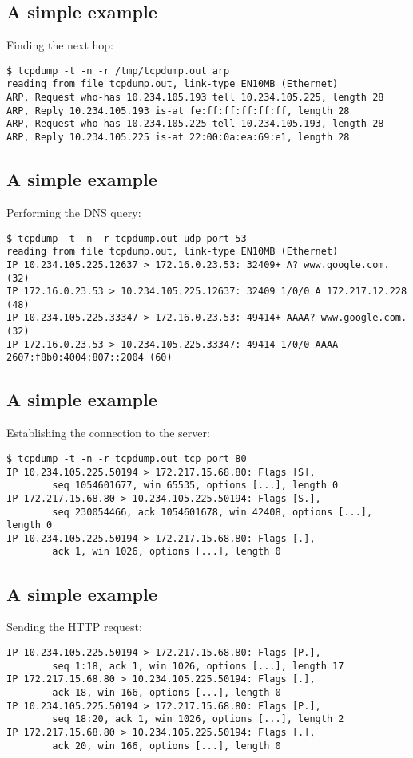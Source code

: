\documentclass[xga]{xdvislides}
\begin{document}
\subsection{A simple example}
Finding the next hop:
\begin{verbatim}
$ tcpdump -t -n -r /tmp/tcpdump.out arp
reading from file tcpdump.out, link-type EN10MB (Ethernet)
ARP, Request who-has 10.234.105.193 tell 10.234.105.225, length 28
ARP, Reply 10.234.105.193 is-at fe:ff:ff:ff:ff:ff, length 28
ARP, Request who-has 10.234.105.225 tell 10.234.105.193, length 28
ARP, Reply 10.234.105.225 is-at 22:00:0a:ea:69:e1, length 28
\end{verbatim}

\subsection{A simple example}
Performing the DNS query:
\begin{verbatim}
$ tcpdump -t -n -r tcpdump.out udp port 53
reading from file tcpdump.out, link-type EN10MB (Ethernet)
IP 10.234.105.225.12637 > 172.16.0.23.53: 32409+ A? www.google.com. (32)
IP 172.16.0.23.53 > 10.234.105.225.12637: 32409 1/0/0 A 172.217.12.228 (48)
IP 10.234.105.225.33347 > 172.16.0.23.53: 49414+ AAAA? www.google.com. (32)
IP 172.16.0.23.53 > 10.234.105.225.33347: 49414 1/0/0 AAAA 2607:f8b0:4004:807::2004 (60)
\end{verbatim}

\subsection{A simple example}
Establishing the connection to the server:
\begin{verbatim}
$ tcpdump -t -n -r tcpdump.out tcp port 80
IP 10.234.105.225.50194 > 172.217.15.68.80: Flags [S],
        seq 1054601677, win 65535, options [...], length 0
IP 172.217.15.68.80 > 10.234.105.225.50194: Flags [S.],
        seq 230054466, ack 1054601678, win 42408, options [...], length 0
IP 10.234.105.225.50194 > 172.217.15.68.80: Flags [.],
        ack 1, win 1026, options [...], length 0
\end{verbatim}

\subsection{A simple example}
Sending the HTTP request:
\begin{verbatim}
IP 10.234.105.225.50194 > 172.217.15.68.80: Flags [P.],
        seq 1:18, ack 1, win 1026, options [...], length 17
IP 172.217.15.68.80 > 10.234.105.225.50194: Flags [.],
        ack 18, win 166, options [...], length 0
IP 10.234.105.225.50194 > 172.217.15.68.80: Flags [P.],
        seq 18:20, ack 1, win 1026, options [...], length 2
IP 172.217.15.68.80 > 10.234.105.225.50194: Flags [.],
        ack 20, win 166, options [...], length 0
\end{verbatim}
\end{document}
